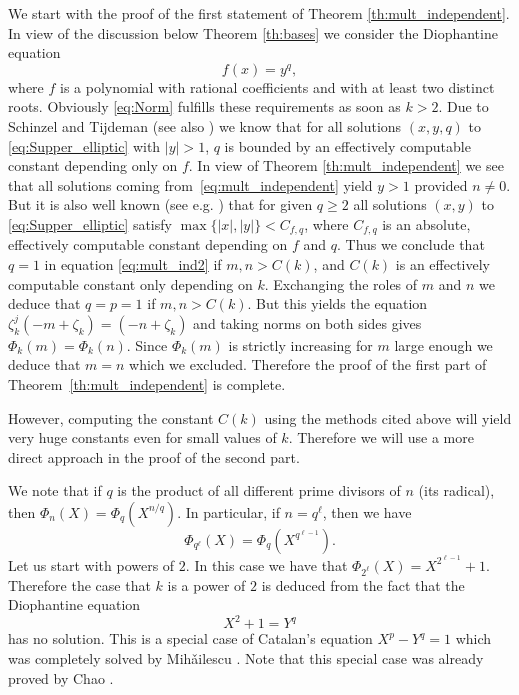 \documentclass{amsart}
\theoremstyle{plain}
\numberwithin{equation}{section}
\theoremstyle{remark}
\begin{document}
We start with the proof of the first statement of Theorem
\ref{th:mult_independent}. In view of the discussion below Theorem \ref{th:bases} we consider the Diophantine
equation
\begin{equation}\label{eq:Supper_elliptic} f(x)=y^q,\end{equation}
where $f$ is a polynomial with rational coefficients and with at least
two distinct roots. Obviously \eqref{eq:Norm} fulfills these
requirements as soon as $k>2$.  Due to Schinzel and Tijdeman
\cite{Schinzel:1976} (see also \cite[Theorem 10.2]{Shorey:Dioph}) we
know that for all solutions $(x,y,q)$ to \eqref{eq:Supper_elliptic}
with $|y|>1$, $q$ is bounded by an effectively computable constant
depending only on $f$. In view of Theorem \ref{th:mult_independent} we
see that all solutions coming from~\eqref{eq:mult_independent} yield
$y>1$ provided $n\neq 0$. But it is also well known (see
e.g. \cite[Theorem 6.1 and 6.2]{Shorey:Dioph}) that for given $q\geq
2$ all solutions $(x,y)$ to \eqref{eq:Supper_elliptic} satisfy
$\max\{|x|,|y|\}<C_{f,q}$, where $C_{f,q}$ is an absolute, effectively
computable constant depending on $f$ and $q$. Thus we conclude that
$q=1$ in equation \eqref{eq:mult_ind2} if $m,n>C(k)$, and $C(k)$ is an
effectively computable constant only depending on $k$. Exchanging the
roles of $m$ and $n$ we deduce that $q=p=1$ if $m,n>C(k)$. But this
yields the equation $\zeta_k^j(-m+\zeta_k)=(-n+\zeta_k)$ and taking
norms on both sides gives $\Phi_k(m)=\Phi_k(n)$. Since $\Phi_k(m)$ is
strictly increasing for $m$ large enough we deduce that $m=n$ which we
excluded. Therefore the proof of the first part of
Theorem~\ref{th:mult_independent} is complete.

However, computing the constant $C(k)$ using the methods cited above
will yield very huge constants even for small values of $k$. Therefore
we will use a more direct approach in the proof of the second part.

We note that if $q$ is the product of all different prime divisors of
$n$ (its radical), then $\Phi_n(X)=\Phi_{q}(X^{n/q})$. In
particular, if $n=q^\ell$, then we have
\begin{equation}\label{eq:PowerRed}
\Phi_{q^{\ell}}(X)=\Phi_{q}\left(X^{q^{\ell -1}}\right). 
\end{equation}
Let us start with powers of $2$. In this case we have that
$\Phi_{2^\ell}(X)=X^{2^{\ell -1}}+1$. Therefore the case that $k$ is a
power of $2$ is deduced from the fact that the Diophantine equation
$$X^2+1=Y^q$$
has no solution. This is a special case of Catalan's equation
$X^p-Y^q=1$ which was completely solved by Mih{\v{a}}ilescu
\cite{Mihailescu:2004}. Note that this special case was already proved
by Chao \cite{Chao:1965}.
\end{document}
